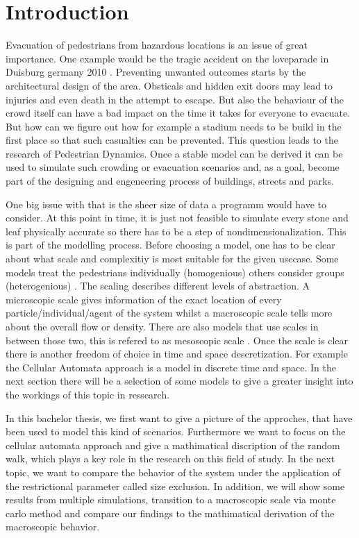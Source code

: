 

\section{Introduction}

Evacuation of pedestrians from hazardous locations is an issue of great importance. 
One example would be the tragic accident on the loveparade in Duisburg germany 2010 \cite{loveparade}.
Preventing unwanted outcomes starts by the architectural design of the area.
Obsticals and hidden exit doors may lead to injuries and even death in the attempt to escape.
But also the behaviour of the crowd itself can have a bad impact on the time it takes for everyone to evacuate.
But how can we figure out how for example a stadium needs to be build in the first place so that such casualties can be prevented.
This question leads to the research of Pedestrian Dynamics. 
Once a stable model can be derived it can be used to simulate such crowding or evacuation scenarios and, as a goal, 
become part of the designing and engeneering process of buildings, streets and parks.

One big issue with that is the sheer size of data a programm would have to consider. 
At this point in time, it is just not feasible to simulate every stone and leaf physically accurate
so there has to be a step of nondimensionalization. 
This is part of the modelling process. 
Before choosing a model, one has to be clear about what scale and complexitiy is most suitable for the given usecase.
Some models treat the pedestrians individually  (homogenious) others consider groups (heterogenious) \cite{zheng2009modeling}.
The scaling describes different levels of abstraction.
A microscopic scale gives information of the exact location of every particle/individual/agent of the system 
whilst a macroscopic scale tells more about the overall flow or density. There are also models that use scales in between 
those two, this is refered to as mesoscopic scale \cite{Michi}. 
Once the scale is clear there is another freedom of choice in time and space descretization. 
For example the Cellular Automata approach is a model in discrete time and space. 
In the next section there will be a selection of some models to give a greater insight into the workings of this topic in ressearch.

In this bachelor thesis, we first want to give a picture of the approches, that have been used to model this kind of scenarios. 
Furthermore we want to focus on the cellular automata approach and give a mathimatical discription of the random walk, 
which plays a key role in the research on this field of study. 
In the next topic, we want to compare the behavior of the system under the application of the restrictional parameter called size exclusion.
In addition, we will show some results from multiple simulations, transition to a macroscopic scale via monte carlo method and compare our findings to 
the mathimatical derivation of the macroscopic behavior. 

